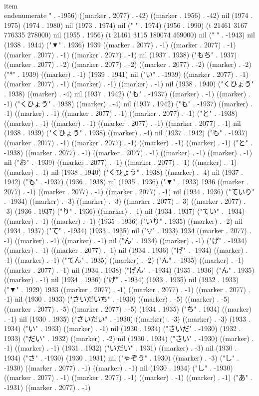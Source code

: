  \\item 
\\end{enumerate}
" . -1956) ((marker . 2077) . -42) ((marker . 1956) . -42) nil (1974 . 1975) (1974 . 1980) nil (1973 . 1974) nil (" " . 1974) (1956 . 1990) (t 21461 3167 776335 278000) nil (1955 . 1956) (t 21461 3115 180074 469000) nil (" " . -1943) nil (1938 . 1944) ("▼" . 1936) 1939 ((marker . 2077) . -1) ((marker . 2077) . -1) ((marker . 2077) . -1) ((marker . 2077) . -1) nil (1937 . 1938) ("もち" . 1937) ((marker . 2077) . -2) ((marker . 2077) . -2) ((marker . 2077) . -2) ((marker) . -2) ("*" . 1939) ((marker) . -1) (1939 . 1941) nil ("い" . -1939) ((marker . 2077) . -1) ((marker . 2077) . -1) ((marker) . -1) ((marker) . -1) nil (1938 . 1940) ("くひょう" . 1938) ((marker) . -4) nil (1937 . 1942) ("も" . -1937) ((marker) . -1) ((marker) . -1) ("くひょう" . 1938) ((marker) . -4) nil (1937 . 1942) ("も" . -1937) ((marker) . -1) ((marker) . -1) ((marker . 2077) . -1) ((marker . 2077) . -1) ("と" . -1938) ((marker) . -1) ((marker) . -1) ((marker . 2077) . -1) ((marker . 2077) . -1) nil (1938 . 1939) ("くひょう" . 1938) ((marker) . -4) nil (1937 . 1942) ("も" . -1937) ((marker . 2077) . -1) ((marker . 2077) . -1) ((marker) . -1) ((marker) . -1) ("と" . -1938) ((marker . 2077) . -1) ((marker . 2077) . -1) ((marker) . -1) ((marker) . -1) nil ("お" . -1939) ((marker . 2077) . -1) ((marker . 2077) . -1) ((marker) . -1) ((marker) . -1) nil (1938 . 1940) ("くひょう" . 1938) ((marker) . -4) nil (1937 . 1942) ("も" . -1937) (1936 . 1938) nil (1935 . 1936) ("▼" . 1933) 1936 ((marker . 2077) . -1) ((marker . 2077) . -1) ((marker . 2077) . -1) nil (1934 . 1936) ("ていり" . -1934) ((marker) . -3) ((marker) . -3) ((marker . 2077) . -3) ((marker . 2077) . -3) (1936 . 1937) ("り" . 1936) ((marker) . -1) nil (1934 . 1937) ("てい" . -1934) ((marker) . -1) ((marker) . -1) (1935 . 1936) ("いり" . 1935) ((marker) . -2) nil (1934 . 1937) ("て" . -1934) (1933 . 1935) nil ("▽" . 1933) 1934 ((marker . 2077) . -1) ((marker) . -1) ((marker) . -1) nil ("ん" . 1934) ((marker) . -1) ("げ" . -1934) ((marker) . -1) ((marker . 2077) . -1) nil (1934 . 1936) ("げ" . -1934) ((marker) . -1) ((marker) . -1) ("てん" . 1935) ((marker) . -2) ("ん" . -1935) ((marker) . -1) ((marker . 2077) . -1) nil (1934 . 1938) ("げん" . -1934) (1935 . 1936) ("ん" . 1935) ((marker) . -1) nil (1934 . 1936) ("げ" . -1934) (1933 . 1935) nil (1932 . 1933) ("▼" . 1929) 1933 ((marker . 2077) . -1) ((marker . 2077) . -1) ((marker . 2077) . -1) nil (1930 . 1933) ("さいだいち" . -1930) ((marker) . -5) ((marker) . -5) ((marker . 2077) . -5) ((marker . 2077) . -5) (1934 . 1935) ("ち" . 1934) ((marker) . -1) nil (1930 . 1935) ("さいだい" . -1930) ((marker) . -3) ((marker) . -3) (1933 . 1934) ("い" . 1933) ((marker) . -1) nil (1930 . 1934) ("さいだ" . -1930) (1932 . 1933) ("だい" . 1932) ((marker) . -2) nil (1930 . 1934) ("さい" . -1930) ((marker) . -1) ((marker) . -1) (1931 . 1932) ("いだい" . 1931) ((marker) . -3) nil (1930 . 1934) ("さ" . -1930) (1930 . 1931) nil ("ゃぞう" . 1930) ((marker) . -3) ("し" . -1930) ((marker . 2077) . -1) ((marker) . -1) nil (1930 . 1934) ("し" . -1930) ((marker . 2077) . -1) ((marker . 2077) . -1) ((marker) . -1) ((marker) . -1) ("あ" . -1931) ((marker . 2077) . -1) 